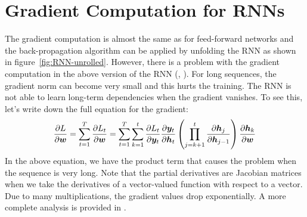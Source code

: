 	\section{Gradient Computation for RNNs}\label{sec:gradient_computation_RNN}
		The gradient computation is almost the same as for feed-forward networks and the back-propagation algorithm can be applied by unfolding the RNN as shown in figure~\ref{fig:RNN-unrolled}.
		However, there is a problem with the gradient computation in the above version of the RNN (\cite{pascanu2013difficulty}, \cite{bengio1994learning}).
		For long sequences, the gradient norm can become very small and this hurts the training.
		The RNN is not able to learn long-term dependencies when the gradient vanishes.
		To see this, let's write down the full equation for the gradient:
		\begin{equation}\label{eq:gradient_computation_RNN}
			\frac{\partial L}{\partial \bm{w}}
			= \sum_{t=1}^{T} 
				\frac{\partial L_t}{\partial \bm{w}}
			= \sum_{t=1}^{T} 
				\sum_{k=1}^{t} 
					\frac{\partial L_t}{\partial \bm{y}_t}
					\frac{\partial \bm{y}_t}{\partial \bm{h}_t}
					\left(
						\prod_{j=k+1}^{t} \frac{\partial \bm{h}_j}{\partial \bm{h}_{j-1}}
					\right)
					\frac{\partial \bm{h}_{k}}{\partial \bm{w}}
		\end{equation}
		In the above equation, we have the product term that causes the problem when the sequence is very long.
		Note that the partial derivatives are Jacobian matrices when we take the derivatives of a vector-valued function with respect to a vector.
		Due to many multiplications, the gradient values drop exponentially.
		A more complete analysis is provided in \cite{pascanu2013difficulty}.
		

